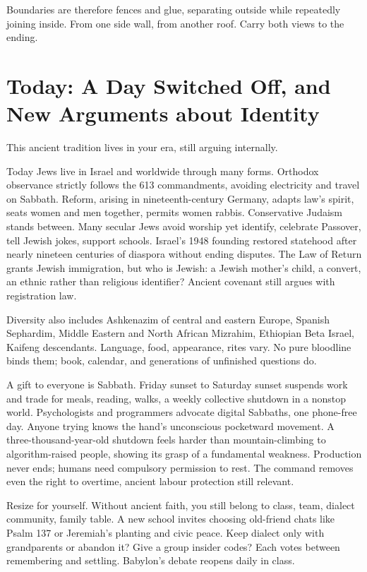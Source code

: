 Boundaries are therefore fences and glue, separating outside while repeatedly joining inside. From one side wall, from another roof. Carry both views to the ending.

\section[Switching Off and Asking Who We Are]{Today: A Day Switched Off, and New Arguments about Identity}
This ancient tradition lives in your era, still arguing internally.

Today Jews live in Israel and worldwide through many forms. Orthodox observance strictly follows the 613 commandments, avoiding electricity and travel on Sabbath. Reform, arising in nineteenth-century Germany, adapts law's spirit, seats women and men together, permits women rabbis. Conservative Judaism stands between. Many secular Jews avoid worship yet identify, celebrate Passover, tell Jewish jokes, support schools. Israel's 1948 founding restored statehood after nearly nineteen centuries of diaspora without ending disputes. The Law of Return grants Jewish immigration, but who is Jewish: a Jewish mother's child, a convert, an ethnic rather than religious identifier? Ancient covenant still argues with registration law.

Diversity also includes Ashkenazim of central and eastern Europe, Spanish Sephardim, Middle Eastern and North African Mizrahim, Ethiopian Beta Israel, Kaifeng descendants. Language, food, appearance, rites vary. No pure bloodline binds them; book, calendar, and generations of unfinished questions do.

A gift to everyone is Sabbath. Friday sunset to Saturday sunset suspends work and trade for meals, reading, walks, a weekly collective shutdown in a nonstop world. Psychologists and programmers advocate digital Sabbaths, one phone-free day. Anyone trying knows the hand's unconscious pocketward movement. A three-thousand-year-old shutdown feels harder than mountain-climbing to algorithm-raised people, showing its grasp of a fundamental weakness. Production never ends; humans need compulsory permission to rest. The command removes even the right to overtime, ancient labour protection still relevant.

Resize for yourself. Without ancient faith, you still belong to class, team, dialect community, family table. A new school invites choosing old-friend chats like Psalm 137 or Jeremiah's planting and civic peace. Keep dialect only with grandparents or abandon it? Give a group insider codes? Each votes between remembering and settling. Babylon's debate reopens daily in class.

